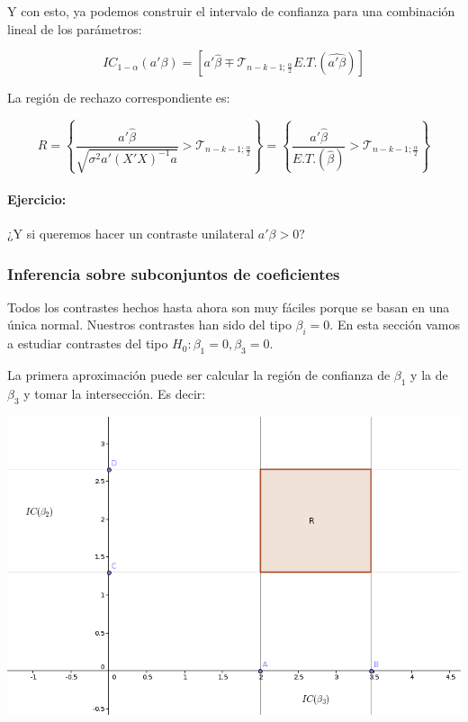 Y con esto, ya podemos construir el intervalo de confianza para una combinación lineal de los parámetros:

\[
IC_{1-α}(a'β) = \left[ a'\hat{β} \mp \mathcal{T}_{n-k-1;\frac{α}{2}}E.T.(\hat{a'β}) \right]
\]

La región de rechazo correspondiente es:

\[
R = \left\{ \frac{a'\hat{β}}{\sqrt{σ^2a'(X'X)^{-1}a}} >  \mathcal{T}_{n-k-1;\frac{α}{2}} \right\} = \left\{ \frac{a'\hat{β}}{E.T.(\hat{β})} >  \mathcal{T}_{n-k-1;\frac{α}{2}} \right\}
\]

\paragraph{Ejercicio:} ¿Y si queremos hacer un contraste unilateral $a'β > 0$?

\subsubsection{Inferencia sobre subconjuntos de coeficientes}

Todos los contrastes hechos hasta ahora son muy fáciles porque se basan en una única normal. Nuestros contrastes han sido del tipo $β_i = 0$. En esta sección vamos a estudiar contrastes del tipo $H_0: β_1 = 0, β_3 = 0$. 

La primera aproximación puede ser calcular la región de confianza de $β_1$ y la de $β_3$ y tomar la intersección. Es decir:

\begin{center}
\includegraphics[scale=0.5]{img/confianzamultivariantemal.png}
\end{center}

